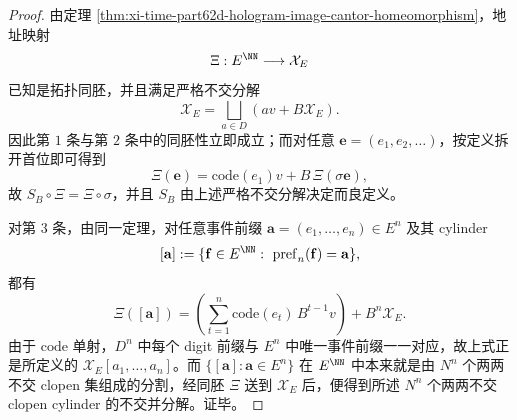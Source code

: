\begin{proof}
由定理 \ref{thm:xi-time-part62d-hologram-image-cantor-homeomorphism}，地址映射
\[
\Xi:E^{\NN}\longrightarrow \mathcal X_E
\]
已知是拓扑同胚，并且满足严格不交分解
\[
\mathcal X_E=\bigsqcup_{a\in D}(av+B\mathcal X_E).
\]
因此第 \(1\) 条与第 \(2\) 条中的同胚性立即成立；而对任意
\(
\mathbf e=(e_1,e_2,\dots)
\)，按定义拆开首位即可得到
\[
\Xi(\mathbf e)=\mathrm{code}(e_1)v+B\,\Xi(\sigma\mathbf e),
\]
故 \(S_B\circ \Xi=\Xi\circ \sigma\)，并且 \(S_B\) 由上述严格不交分解决定而良定义。

对第 \(3\) 条，由同一定理，对任意事件前缀 \(\mathbf a=(e_1,\dots,e_n)\in E^n\) 及其 cylinder
\[
[\mathbf a]:=\{\mathbf f\in E^{\NN}:\ \mathrm{pref}_n(\mathbf f)=\mathbf a\},
\]
都有
\[
\Xi([\mathbf a])
=
\left(\sum_{t=1}^{n}\mathrm{code}(e_t)\,B^{t-1}v\right)+B^n\mathcal X_E.
\]
由于 \(\mathrm{code}\) 单射，\(D^n\) 中每个 digit 前缀与 \(E^n\) 中唯一事件前缀一一对应，故上式正是所定义的 \(\mathcal X_E[a_1,\dots,a_n]\)。而 \(\{[\mathbf a]:\mathbf a\in E^n\}\) 在 \(E^{\NN}\) 中本来就是由 \(N^n\) 个两两不交 clopen 集组成的分割，经同胚 \(\Xi\) 送到 \(\mathcal X_E\) 后，便得到所述 \(N^n\) 个两两不交 clopen cylinder 的不交并分解。证毕。
\end{proof}

